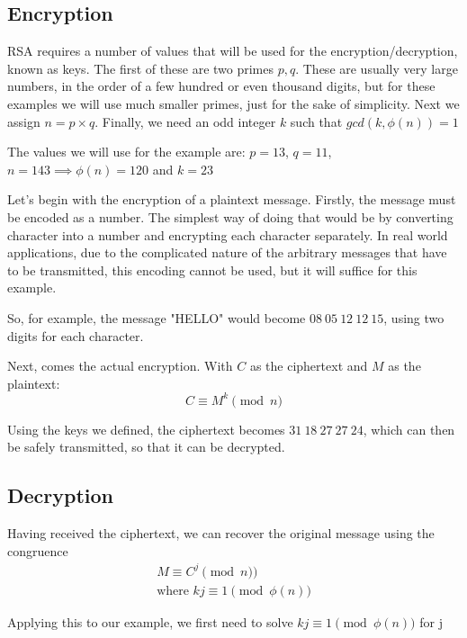 \documentclass[12pt]{article}
\begin{document}
    \subsection{Encryption}
    RSA requires a number of values that will be used for the
    encryption/decryption, known as keys.  The first of these are two primes
    $p,q$. These are usually very large numbers, in the order of a few hundred
    or even thousand digits, but for these examples we will use much smaller
    primes, just for the sake of simplicity. Next we assign $n=p \times q$.
    Finally, we need an odd integer $k$ such that $gcd(k, \phi (n)) = 1$ 

    The values we will use for the example are: $p=13$, $q=11$, $n=143 \implies
    \phi (n) = 120$ and $k = 23$

    Let's begin with the encryption of a plaintext message. Firstly, the message
    must be encoded as a number. The simplest way of doing that would be by
    converting character into a number and encrypting each character separately.
    In real world applications, due to the complicated nature of the arbitrary
    messages that have to be transmitted, this encoding cannot be used, but it
    will suffice for this example.

    So, for example, the message "HELLO" would become $08\ 05\ 12\ 12\ 15$,
    using two digits for each character.

    Next, comes the actual encryption. With $C$ as the ciphertext and $M$ as the
    plaintext:
    \begin{equation*}
        C \equiv M^{k} \pmod{n}
    \end{equation*}

    Using the keys we defined, the ciphertext becomes $31\ 18\ 27\ 27\ 24$,
    which can then be safely transmitted, so that it can be decrypted.

    \subsection{Decryption}
    Having received the ciphertext, we can recover the original message using
    the congruence
    \begin{align*}
        M \equiv C^j \pmod{n})\\
        \text{where } kj \equiv 1 \pmod{\phi (n)}
    \end{align*}

    Applying this to our example, we first need to solve $
    kj \equiv 1 \pmod{\phi (n)}$ for j
\end{document}
